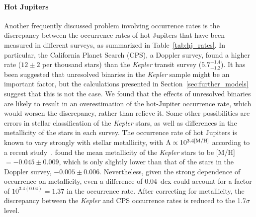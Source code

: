 \documentclass[12pt,modern]{aastex61}
\begin{document}
\paragraph{Hot Jupiters} Another frequently discussed problem
involving occurrence rates is the discrepancy between the occurrence
rates of hot Jupiters that have been measured in different surveys, as
summarized in Table~\ref{tab:hj_rates}.  In particular, the California
Planet Search (CPS), a Doppler survey, found a higher rate ($12\pm 2$
per thousand stars) than the {\it Kepler} transit survey
($5.7^{+1.4}_{-1.2}$).  It has been suggested that unresolved binaries
in the {\it Kepler} sample might be an important factor, but the
calculations presented in Section~\ref{sec:further_models} suggest
that this is not the case.  We found that the effects of unresolved
binaries are likely to result in an overestimation of the hot-Jupiter
occurrence rate, which would worsen the discrepancy, rather than
relieve it. Some other possibilities are errors in stellar
classification of the {\it Kepler} stars, as well as differences in
the metallicity of the stars in each survey.  The occurrence rate of
hot Jupiters is known to vary strongly with stellar metallicity, with
$\Lambda \propto 10^{3.4{\rm [M/H]}}$ according to a recent
study~\citep{petigura_CKS_2017}.  \citet{guo_metallicity_2017} found
the mean metallicity of the {\it Kepler} stars to be [M/H]~$=-0.045\pm
0.009$, which is only slightly lower than that of the stars in the
Doppler survey, $-0.005\pm 0.006$.  Nevertheless, given the strong
dependence of occurrence on metallicity, even a difference of
$0.04$~dex could account for a factor of $10^{3.4(0.04)} = 1.37$
in the occurrence rate.  After correcting for metallicity, the
discrepancy between the {\it Kepler} and CPS occurrence rates is
reduced to the 1.7$\sigma$ level.
\end{document}
